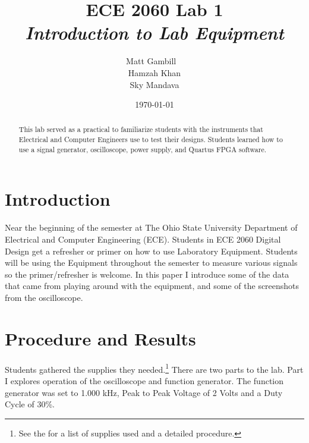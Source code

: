 \documentclass[journal,onecolumn]{IEEEtran}
\title{ECE 2060 Lab 1\\ 
\Large \textit{Introduction to Lab Equipment}}
\author{Matt Gambill ~\IEEEmembership{Member, OSU IEEE} \\
		Hamzah Khan\\
		Sky Mandava}
\date{\today}
\begin{document}
\maketitle

\begin{abstract}
This lab served as a practical to familiarize students with the instruments that Electrical and Computer Engineers use to test their designs. Students learned how to use a signal generator, oscilloscope, power supply, and Quartus FPGA software.
\end{abstract}

\section*{Introduction}
Near the beginning of the semester at The Ohio State University Department of Electrical and Computer Engineering (ECE). Students in ECE 2060 Digital Design get a refresher or primer on how to use Laboratory Equipment. Students will be using the Equipment throughout the semester to measure various signals so the primer/refresher is welcome. In this paper I introduce some of the data that came from playing around with the equipment, and some of the screenshots from the oscilloscope.
\section*{Procedure and Results}
Students gathered the supplies they needed.\footnote{ See \cite{readMe} the for a list of supplies used and a detailed procedure.} 
There are two parts to the lab. Part I explores operation of the oscilloscope and function generator. The function generator was set to 1.000 kHz, Peak to Peak Voltage of 2 Volts and a Duty Cycle of 30\%.
 
\end{document}
